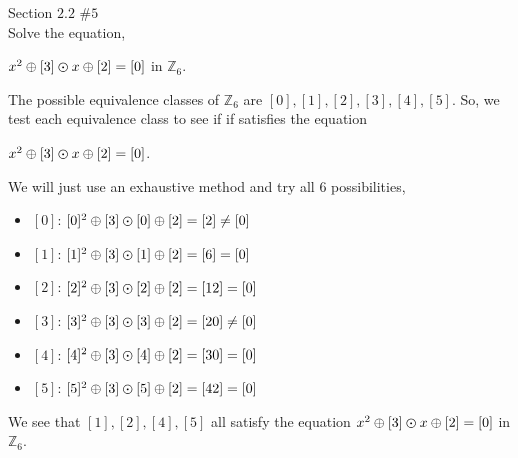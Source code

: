 \documentclass[12pt]{article}
\newcommand{\Z}{\mathbb{Z}}
\newenvironment{problem}[2][Problem]{\begin{trivlist}
\item[\hskip \labelsep {\bfseries #1}\hskip \labelsep {\bfseries #2.}]}{\end{trivlist}}
\begin{document}
\begin{problem}{8} Section $2.2$ $\#5$ \\

\noindent
Solve the equation, \\
\begin{center}
$x^2 \oplus [3] \varodot x \oplus [2] =[0]$ in $\Z_6$. \\
\end{center}
\noindent
The possible equivalence classes of $\Z_6$ are $[0],[1],[2],[3],[4],[5]$. So, we test each equivalence class to see if if satisfies the equation
\begin{center}
$x^2 \oplus [3] \varodot x \oplus [2] =[0]$.
\end{center}
\noindent
We will just use an exhaustive method and try all $6$ possibilities,
\renewcommand\labelitemi{\tiny$\bullet$}
\begin{itemize}
\item $[0]$: $[0]^2 \oplus [3] \varodot [0] \oplus [2]=[2]\neq [0]$ \\
\item $[1]$: $[1]^2 \oplus [3] \varodot [1] \oplus [2]=[6]= [0]$ \\
\item $[2]$: $[2]^2 \oplus [3] \varodot [2] \oplus [2]=[12]= [0]$ \\
\item $[3]$: $[3]^2 \oplus [3] \varodot [3] \oplus [2]=[20]\neq [0]$ \\
\item $[4]$: $[4]^2 \oplus [3] \varodot [4] \oplus [2]=[30]= [0]$ \\
\item $[5]$: $[5]^2 \oplus [3] \varodot [5] \oplus [2]=[42]= [0]$
\end{itemize}
\noindent
We see that $[1],[2],[4],[5]$ all satisfy the equation $x^2 \oplus [3] \varodot x \oplus [2] =[0]$ in $\Z_6$. \qedsymbol
\end{problem}
\end{document}

